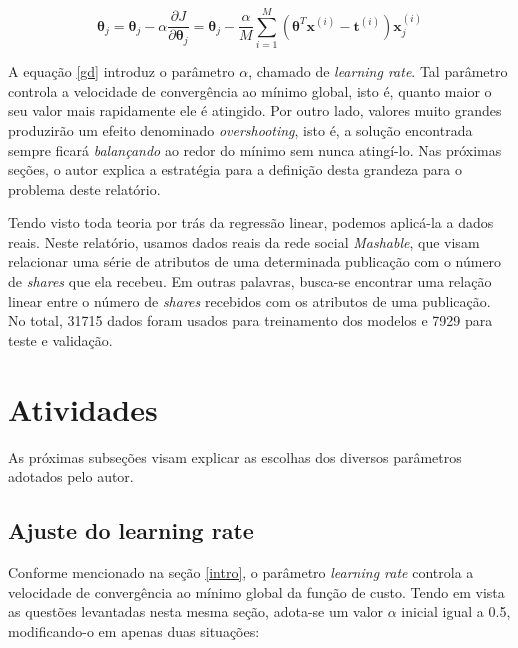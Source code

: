 \documentclass[10pt,twocolumn,letterpaper]{article}
\begin{document}
\begin{equation}
\label {gd}
\bm{\theta}_j = \bm{\theta}_j - \alpha\frac{\partial J}{\partial \bm{\theta}_j } = \bm{\theta}_j - \frac{\alpha}{M} \displaystyle\sum_{i=1}^{M} \left(\bm{\theta}^T\bm{x}^{(i)} - \bm{t}^{(i)}\right)\bm{x}_j^{(i)}
\end{equation}

A equação \ref{gd} introduz o parâmetro \(\alpha\), chamado de \textit{learning rate}. Tal parâmetro controla a velocidade de convergência ao mínimo global, isto é, quanto maior o seu valor mais rapidamente ele é atingido. Por outro lado, valores muito grandes produzirão um efeito denominado \textit {overshooting}, isto é, a solução encontrada sempre ficará \textit{balançando} ao redor do mínimo sem nunca atingí-lo. Nas próximas seções, o autor explica a estratégia para a definição desta grandeza para o problema deste relatório.

Tendo visto toda teoria por trás da regressão linear, podemos aplicá-la a dados reais. Neste relatório, usamos dados reais \cite{database} da rede social \textit{Mashable}, que visam relacionar uma série de atributos de uma determinada publicação com o número de \textit{shares} que ela recebeu. Em outras palavras, busca-se encontrar uma relação linear entre o número de \textit{shares} recebidos com os atributos de uma publicação. No total, 31715 dados foram usados para treinamento dos modelos e 7929 para teste e validação.

\section{Atividades}

As próximas subseções visam explicar as escolhas dos diversos parâmetros adotados pelo autor.

\subsection{Ajuste do learning rate}
\label{sec:ajuste}
Conforme mencionado na seção \ref{intro}, o parâmetro \textit{learning rate} controla a velocidade de convergência ao mínimo global da função de custo. Tendo em vista as questões levantadas nesta mesma seção, adota-se um valor \(\alpha\) inicial igual a 0.5, modificando-o em apenas duas situações:
\end{document}
